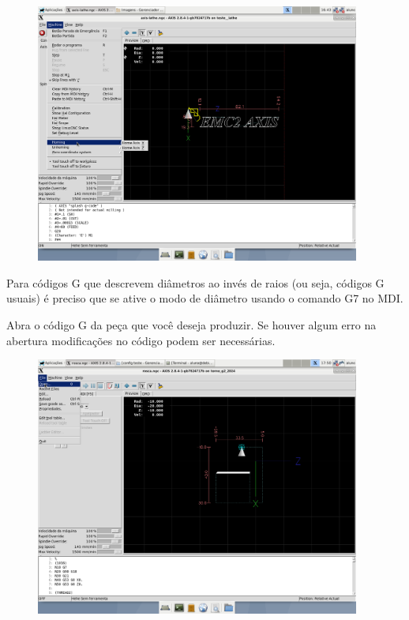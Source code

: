 \documentclass[twoside,a4paper]{refart}
\begin{document}
\begin{figure}[H]
    \begin{center}
        \includegraphics[width=0.95\textwidth]{imagens/referenciamento_linux_CNC.png}
    \end{center}
    \caption{}\label{homing}
\end{figure}


Para códigos G que descrevem diâmetros ao invés de raios (ou seja, códigos G usuais) é preciso que se ative o modo de diâmetro usando o comando G7 no MDI.

Abra o código G da peça que você deseja produzir. Se houver algum erro na abertura modificações no código podem ser necessárias.

\begin{figure}[H]
    \begin{center}
        \includegraphics[width=0.95\textwidth]{imagens/Selecao_do_programa2.png}
    \end{center}
    \caption{}\label{progselec}
\end{figure}
\end{document}
